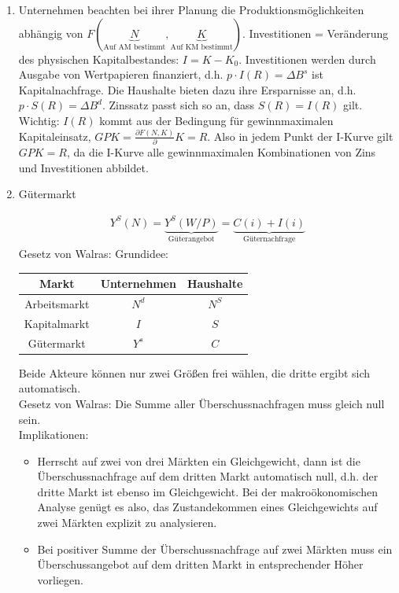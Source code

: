\documentclass{scrartcl}
\begin{document}
\begin{enumerate}
  \item %
  Unternehmen beachten bei ihrer Planung die Produktionsm\"{o}glichkeiten abh\"{a}ngig von $F(\underbrace{N}_\text{Auf AM bestimmt},\underbrace{K}_\text{Auf KM bestimmt})$. Investitionen = Ver\"{a}nderung des physischen Kapitalbestandes: $I = K-K_0$. Investitionen werden durch Ausgabe von Wertpapieren finanziert, d.h. $p \cdot I(R) = \Delta B^s$ ist Kapitalnachfrage. Die Haushalte bieten dazu ihre Ersparnisse an, d.h. $p \cdot S(R) = \Delta B^d$. Zinssatz passt sich so an, dass $S(R)=I(R)$ gilt. \\
  Wichtig: $I(R)$ kommt aus der Bedingung f\"{u}r gewinnmaximalen Kapitaleinsatz, $GPK = \frac{\partial F(N,K)}\partial K = R$. Also in jedem Punkt der I-Kurve gilt $GPK = R$, da die I-Kurve alle gewinnmaximalen Kombinationen von Zins und Investitionen abbildet.
  \item G\"{u}termarkt

  \begin{align*}
  Y^S(N) = \underbrace{Y^S(W/P)}_\text{G\"{u}terangebot} = \underbrace{C(i)+I(i)}_\text{G\"{u}ternachfrage}
  \end{align*}
  Gesetz von Walras: Grundidee:
  \begin{tabular}{c|c|c}
    Markt & Unternehmen  & Haushalte \\
  \hline  Arbeitsmarkt& $N^d$  & $N^S$  \\
  \hline  Kapitalmarkt& $I$  & $S$  \\
  \hline  G\"{u}termarkt& $Y^s$  & $C$
  \end{tabular}
  Beide Akteure k\"{o}nnen nur zwei Gr\"{o}{\ss}en frei w\"{a}hlen, die dritte ergibt sich automatisch.\\
  Gesetz von Walras: Die Summe aller \"{U}berschussnachfragen muss gleich null sein.\\
  Implikationen:
  \begin{itemize}
	\item Herrscht auf zwei von drei M\"{a}rkten ein Gleichgewicht, dann ist die \"{U}berschussnachfrage auf dem dritten Markt automatisch null, d.h. der dritte Markt ist ebenso im Gleichgewicht. Bei der makro\"{o}konomischen Analyse gen\"{u}gt es also, das Zustandekommen eines Gleichgewichts auf zwei M\"{a}rkten explizit zu analysieren.
	\item   Bei positiver Summe der \"{U}berschussnachfrage auf zwei M\"{a}rkten muss ein \"{U}berschussangebot auf dem dritten Markt in entsprechender H\"{o}her vorliegen.
  \end{itemize}


\end{enumerate}
\end{document}
